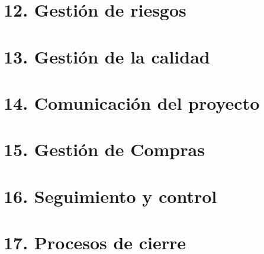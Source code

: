 \documentclass[11pt]{charter}
\begin{document}
\section{12. Gestión de riesgos}
\section{13. Gestión de la calidad}
\section{14. Comunicación del proyecto}
\section{15. Gestión de Compras}
\section{16. Seguimiento y control}
\section{17. Procesos de cierre}    

%
\end{document}
